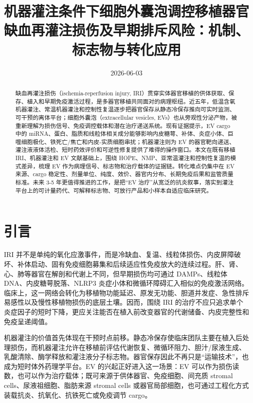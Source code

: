 \documentclass[11pt,a4paper]{article}
\title{机器灌注条件下细胞外囊泡调控移植器官缺血再灌注损伤及早期排斥风险：机制、标志物与转化应用}
\author{}
\date{2026-06-03}
\begin{document}
\maketitle
\tableofcontents
\newpage

\begin{abstract}
缺血再灌注损伤（ischemia-reperfusion injury,
IRI）贯穿实体器官移植的供体获取、保存、植入和早期免疫激活过程，是多器官移植共同面对的病理枢纽。近五年，低温含氧机器灌注、常温机器灌注和控制性复温逐步把器官保存从静态冷保存推向可实时监测、可干预的离体平台；细胞外囊泡（extracellular
vesicles,
EVs）也从旁观性分泌产物，被重新理解为损伤信号、免疫调控载体和潜在治疗递送系统。现有证据提示，EV
cargo 中的
miRNA、蛋白、脂质和线粒体相关成分能够影响内皮糖萼、补体、炎症小体、巨噬细胞极化、铁死亡/焦亡和内皮-实质细胞串扰；机器灌注则为
EV 的器官靶向递送、灌注液液体活检、短时药效评价和可逆性修复提供了难得的操作窗口。本文在既有移植 IRI、机器灌注和
EV 文献基础上，围绕 HOPE、NMP、亚常温灌注和控制性复温的模式差异，梳理 EV
作为病理信号、标志物和治疗载体的证据链。转化难点仍集中在 EV
来源、cargo 稳定性、剂量单位、纯度、效价、器官内分布、长期免疫后果和监管质量标准。未来
3-5 年更值得推进的工作，是把``EV 治疗''从宽泛的抗炎叙事，落实到灌注平台上的可计量药代、可解释标志物、可放行产品和小样本自适应临床研究。
\end{abstract}

\section{引言}\label{ux5f15ux8a00}

IRI
并不是单纯的氧化应激事件，而是冷缺血、复温、线粒体损伤、内皮屏障破坏、补体启动、固有免疫细胞募集和后续适应性免疫放大的连续过程。肝、肾、心、肺等器官在解剖和代谢上不同，但早期损伤均可通过
DAMPs、线粒体 DNA、内皮糖萼脱落、NLRP3
炎症小体和微循环障碍汇入相似的免疫激活网络\cite{mechanisticinsightand2023, rationalefortargeting2025, theendothelialglycocalyx2021, ischemiareperfusioninjury2024}。临床上，这一网络会转化为移植物功能延迟、原发无功能、胆道并发症、急性排斥易感性以及慢性移植物损伤的底层土壤。因而，围绕
IRI 的治疗不应只追求单个炎症因子的短时下降，更应关注能否在植入前改变器官的代谢储备、内皮完整性和免疫呈递阈值。

机器灌注的价值首先体现在干预时点前移。静态冷保存使临床团队主要在植入后处理损伤，而机器灌注允许在移植前评估代谢恢复、微循环阻力、胆汁/尿液生成、乳酸清除、酶学释放和灌注液分子标志物\cite{exvivokidney2021, currentevidenceand2023, perfusiontechniquesin2024}。器官保存因此不再只是``运输技术''，也成为短时体外药理学平台。EV
的兴起正好进入这一场景：EV
可以作为损伤读数，也可以作为治疗载体；既可来源于供体器官、免疫细胞、间充质
stromal cells、尿液祖细胞、脂肪来源 stromal cells 或器官局部细胞，也可通过工程化方式装载抗炎、抗氧化、抗铁死亡或免疫调节
cargo\cite{extracellularvesiclesas2023, organrepairand2023, mesenchymalstemcells2024}。
\end{document}
